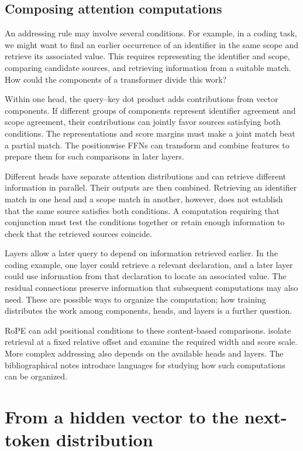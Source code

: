 \documentclass[11pt,twoside]{article}
\theoremstyle{plain}
\theoremstyle{definition}
\theoremstyle{remark}
\begin{document}
\subsection{Composing attention computations}
\label{sec:composing-attention}

An addressing rule may involve several conditions. For example, in a coding
task, we might want to find an earlier occurrence of an
identifier in the same scope and retrieve its associated value. This requires
representing the identifier and scope, comparing candidate sources, and
retrieving information from a suitable match. How could the components of a
transformer divide this work?

Within one head, the query--key dot product adds contributions from vector
components. If different groups of components represent identifier agreement
and scope agreement, their contributions can jointly favor sources satisfying
both conditions. The representations and score margins must make a joint
match beat a partial match. The positionwise FFNs can transform
and combine features to prepare them for such comparisons in later layers.

Different heads have separate attention distributions and can retrieve
different information in parallel. Their outputs are then combined. Retrieving
an identifier match in one head and a scope match in another, however, does
not establish that the same source satisfies both conditions. A computation
requiring that conjunction must test the conditions together or retain enough
information to check that the retrieved sources coincide.

Layers allow a later query to depend on information retrieved earlier. In
the coding example, one layer could retrieve a relevant declaration, and a later layer
could use information from that declaration to locate an associated value.
The residual connections preserve information that subsequent computations
may also need. These are possible ways to organize the computation; how
training distributes the work among components, heads, and layers is a
further question.

RoPE can add positional conditions to these content-based comparisons.
 isolate retrieval at a fixed relative
offset and examine the required width and score scale. More complex addressing also depends on
the available heads and layers. The bibliographical notes introduce languages
for studying how such computations can be organized.

\section{From a hidden vector to the next-token distribution}
\label{sec:output-readout}
\end{document}
